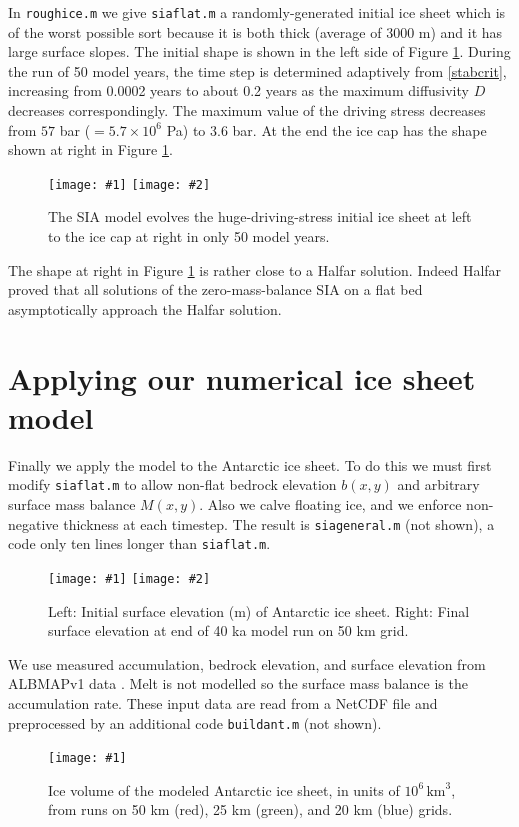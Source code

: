 \documentclass[letterpaper,final,12pt,reqno]{amsart}
\newcommand{\onefigsize}[3]{
\begin{figure}[ht]
\centering
\texttt{[image: \#1]}
\caption{#2}
\label{fig:#1}
\end{figure}}
\newcommand{\onefig}[2]{\onefigsize{#1}{#2}{3.0in}}
\newcommand{\twofigsizes}[5]{
\begin{figure}[ht]
\centering
\texttt{[image: \#1]} \quad
\texttt{[image: \#2]}
\caption{#3}
\label{fig:#1}
\end{figure}}
\newcommand{\twofig}[3]{\twofigsizes{#1}{#2}{#3}{2.5in}{2.5in}}
\begin{document}
In \texttt{roughice.m} we give \texttt{siaflat.m} a randomly-generated initial ice sheet which is of the worst possible sort because it is both thick (average of 3000 m) and it has large surface slopes.  The initial shape is shown in the left side of Figure \ref{fig:roughinitial}.  During the run of 50 model years, the time step is determined adaptively from \eqref{stabcrit}, increasing from 0.0002 years to about 0.2 years as the maximum diffusivity $D$ decreases correspondingly.  The maximum value of the driving stress decreases from $57$ bar ($= 5.7\times 10^6$ Pa) to $3.6$ bar.  At the end the ice cap has the shape shown at right in Figure \ref{fig:roughinitial}.

\twofig{roughinitial}{roughfinal}{The SIA model evolves the huge-driving-stress initial ice sheet at left to the ice cap at right in only 50 model years.}

The shape at right in Figure \ref{fig:roughinitial} is rather close to a Halfar solution.  Indeed Halfar proved that all solutions of the zero-mass-balance SIA on a flat bed asymptotically approach the Halfar solution.


\section{Applying our numerical ice sheet model}

Finally we apply the model to the Antarctic ice sheet.  To do this we must first modify \texttt{siaflat.m} to allow non-flat bedrock elevation $b(x,y)$ and arbitrary surface mass balance $M(x,y)$.  Also we calve floating ice, and we enforce non-negative thickness at each timestep.  The result is \texttt{siageneral.m} (not shown), a code only ten lines longer than \texttt{siaflat.m}.

\twofigsizes{antinitial}{antfinal}{Left: Initial surface elevation (m) of Antarctic ice sheet.  Right: Final surface elevation at end of 40 ka model run on 50 km grid.}{2.55in}{3.2in}

We use measured accumulation, bedrock elevation, and surface elevation from ALBMAPv1 data \cite{LeBrocqetal2010}.  Melt is not modelled so the surface mass balance is the accumulation rate.  These input data are read from a NetCDF file and preprocessed by an additional code \texttt{buildant.m} (not shown).

\onefig{antvolcompare}{Ice volume of the modeled Antarctic ice sheet, in units of $10^6 \, \text{km}^3$, from runs on 50 km (red), 25 km (green), and 20 km (blue) grids.}
\end{document}

